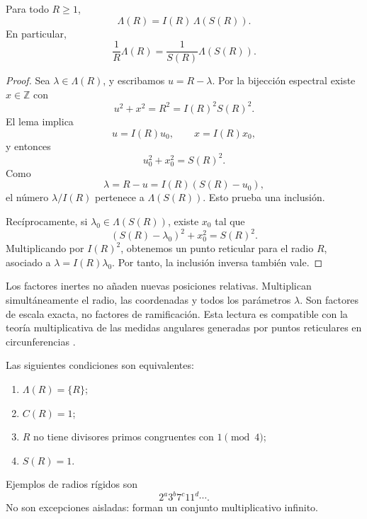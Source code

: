 \documentclass[11pt,a4paper,openany]{report}
\newcommand{\Z}{\mathbb{Z}}
\newcommand{\Lam}{\Lambda}
\begin{document}
\begin{theorem}
Para todo \(R\ge1\),
\begin{equation}
 \boxed{\Lam(R)=I(R)\,\Lam(S(R)).}
 \label{eq:inert-rigidity}
\end{equation}
En particular,
\begin{equation}
 \boxed{
 \frac1R\Lam(R)=\frac1{S(R)}\Lam(S(R)).}
 \label{eq:normalized-spectrum}
\end{equation}
\end{theorem}

\begin{proof}
Sea \(\lambda\in\Lam(R)\), y escribamos \(u=R-\lambda\). Por la bijección espectral existe \(x\in\Z\) con
\[
 u^2+x^2=R^2=I(R)^2S(R)^2.
\]
El lema implica
\[
 u=I(R)u_0,
 \qquad
 x=I(R)x_0,
\]
y entonces
\[
 u_0^2+x_0^2=S(R)^2.
\]
Como
\[
 \lambda=R-u=I(R)(S(R)-u_0),
\]
el número \(\lambda/I(R)\) pertenece a \(\Lam(S(R))\). Esto prueba una inclusión.

Recíprocamente, si \(\lambda_0\in\Lam(S(R))\), existe \(x_0\) tal que
\[
 (S(R)-\lambda_0)^2+x_0^2=S(R)^2.
\]
Multiplicando por \(I(R)^2\), obtenemos un punto reticular para el radio \(R\), asociado a \(\lambda=I(R)\lambda_0\). Por tanto, la inclusión inversa también vale.
\end{proof}

\begin{insightbox}
Los factores inertes no añaden nuevas posiciones relativas. Multiplican simultáneamente el radio, las coordenadas y todos los parámetros \(\lambda\). Son factores de escala exacta, no factores de ramificación. Esta lectura es compatible con la teoría multiplicativa de las medidas angulares generadas por puntos reticulares en circunferencias \cite{KurlbergWigman}.
\end{insightbox}

\begin{corollary}
Las siguientes condiciones son equivalentes:
\begin{enumerate}[label=(\roman*)]
\item \(\Lam(R)=\{R\}\);
\item \(C(R)=1\);
\item \(R\) no tiene divisores primos congruentes con \(1\pmod4\);
\item \(S(R)=1\).
\end{enumerate}
\end{corollary}

Ejemplos de radios rígidos son
\[
 2^a3^b7^c11^d\cdots.
\]
No son excepciones aisladas: forman un conjunto multiplicativo infinito.
\end{document}
